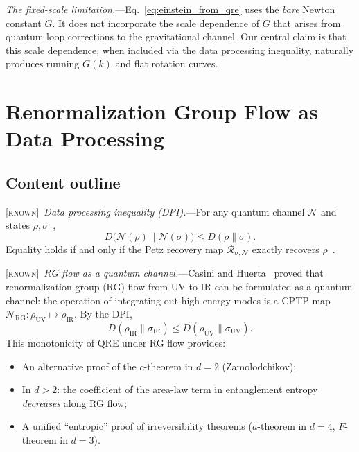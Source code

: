 \documentclass[prl,twocolumn,superscriptaddress,longbibliography,floatfix]{revtex4-2}
\newcommand{\Petz}{\mathcal{R}}
\newcommand{\chan}{\mathcal{N}}
\newcommand{\known}{\textsc{[known]}}
\begin{document}
\emph{The fixed-scale limitation.}---Eq.~\eqref{eq:einstein_from_qre}
uses the \emph{bare} Newton constant $G$. It does not incorporate
the scale dependence of $G$ that arises from quantum loop corrections
to the gravitational channel. Our central claim is that this scale
dependence, when included via the data processing inequality,
naturally produces running $G(k)$ and flat rotation curves.

\section{Renormalization Group Flow as Data Processing}
\label{sec:rg_dpi}

\subsection*{Content outline}

\known\ \emph{Data processing inequality (DPI).}---For any
quantum channel $\chan$ and states $\rho, \sigma$~\cite{Lindblad1975,Uhlmann1977},
\begin{equation}
D\!\big(\chan(\rho)\big\|\chan(\sigma)\big)
\leq D(\rho\|\sigma).
\label{eq:dpi}
\end{equation}
Equality holds if and only if the Petz recovery map
$\Petz_{\sigma,\chan}$ exactly recovers $\rho$~\cite{Petz1986,Petz1988}.

\known\ \emph{RG flow as a quantum channel.}---Casini and
Huerta~\cite{CasiniHuerta2017} proved that renormalization group
(RG) flow from UV to IR can be formulated as a quantum channel:
the operation of integrating out high-energy modes is a CPTP map
$\chan_{\mathrm{RG}}: \rho_{\mathrm{UV}} \mapsto \rho_{\mathrm{IR}}$.
By the DPI,
\begin{equation}
D(\rho_{\mathrm{IR}} \| \sigma_{\mathrm{IR}})
\leq D(\rho_{\mathrm{UV}} \| \sigma_{\mathrm{UV}}).
\label{eq:rg_dpi}
\end{equation}
This monotonicity of QRE under RG flow provides:
\begin{itemize}
\item An alternative proof of the $c$-theorem in $d = 2$
  (Zamolodchikov);
\item In $d > 2$: the coefficient of the area-law term in
  entanglement entropy \emph{decreases} along RG flow;
\item A unified ``entropic'' proof of irreversibility theorems
  ($a$-theorem in $d = 4$, $F$-theorem in $d = 3$).
\end{itemize}
\end{document}
